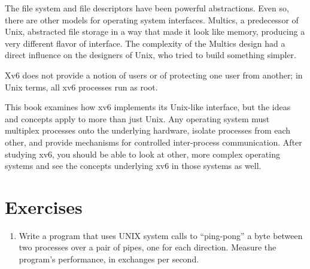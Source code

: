 The file system and file descriptors have been  powerful
abstractions.
Even so, there are other models for operating system interfaces.
Multics, a predecessor of Unix,
abstracted file storage in a way that made it look like memory,
producing a very different flavor of interface.
The complexity of the Multics design had a direct influence
on the designers of Unix, who tried to build something simpler.

Xv6 does not provide a notion of users or of protecting
one user from another; in Unix terms, all xv6 processes
run as root.

This book examines how xv6 implements its Unix-like interface,
but the ideas and concepts apply to more than just Unix.
Any operating system must multiplex processes onto
the underlying hardware, isolate processes from each
other, and provide mechanisms for controlled
inter-process communication.
After studying xv6, you should be able to
look at other, more complex operating systems
and see the concepts underlying xv6 in those systems as well.

\section{Exercises}

\begin{enumerate}

\item Write a program that uses UNIX system calls to
``ping-pong'' a byte between two processes over a pair
of pipes, one for each direction. Measure the
program's performance, in exchanges per second.

\end{enumerate}
